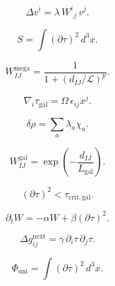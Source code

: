 \[
\Delta v^i = \lambda\, W^i{}_j\, v^j.
\]

\[
S = \int (\partial\tau)^2\, d^3x.
\]

\[
W_{IJ}^{\mathrm{mega}} = \frac{1}{1 + (d_{IJ}/\mathcal{L})^p }.
\]

\[
\nabla_i \tau_{\mathrm{gal}} = \Omega\, \epsilon_{ij} x^j.
\]

\[
\delta\rho = \sum_a \lambda_a \chi_a.
\]

\[
W_{IJ}^{\mathrm{gal}} = \exp\!\left(-\frac{d_{IJ}}{L_{\mathrm{gal}}}\right).
\]

\[
(\partial\tau)^2 < \tau_{\mathrm{crit,gal}}.
\]

\[
\partial_t W = -\alpha W + \beta (\partial\tau)^2.
\]

\[
\Delta g_{ij}^{\mathrm{next}} = \gamma\, \partial_i\tau\,\partial_j\tau.
\]

\[
\Phi_{\mathrm{uni}} = \int (\partial\tau)^2\, d^3x.
\]

